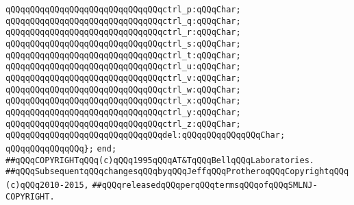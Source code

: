 \verb|qQQqqQQqqQQqqQQqqQQqqQQqqQQqqQQqctrl_p:qQQqChar;|\newline
\verb|qQQqqQQqqQQqqQQqqQQqqQQqqQQqqQQqctrl_q:qQQqChar;|\newline
\verb|qQQqqQQqqQQqqQQqqQQqqQQqqQQqqQQqctrl_r:qQQqChar;|\newline
\verb|qQQqqQQqqQQqqQQqqQQqqQQqqQQqqQQqctrl_s:qQQqChar;|\newline
\verb|qQQqqQQqqQQqqQQqqQQqqQQqqQQqqQQqctrl_t:qQQqChar;|\newline
\verb|qQQqqQQqqQQqqQQqqQQqqQQqqQQqqQQqctrl_u:qQQqChar;|\newline
\verb|qQQqqQQqqQQqqQQqqQQqqQQqqQQqqQQqctrl_v:qQQqChar;|\newline
\verb|qQQqqQQqqQQqqQQqqQQqqQQqqQQqqQQqctrl_w:qQQqChar;|\newline
\verb|qQQqqQQqqQQqqQQqqQQqqQQqqQQqqQQqctrl_x:qQQqChar;|\newline
\verb|qQQqqQQqqQQqqQQqqQQqqQQqqQQqqQQqctrl_y:qQQqChar;|\newline
\verb|qQQqqQQqqQQqqQQqqQQqqQQqqQQqqQQqctrl_z:qQQqChar;|\newline
\verb|qQQqqQQqqQQqqQQqqQQqqQQqqQQqqQQqdel:qQQqqQQqqQQqqQQqChar;|\newline
\verb|qQQqqQQqqQQqqQQq};|\newline
\verb|end;|\newline
\newline
\newline
\verb|##qQQqCOPYRIGHTqQQq(c)qQQq1995qQQqAT&TqQQqBellqQQqLaboratories.|\newline
\verb|##qQQqSubsequentqQQqchangesqQQqbyqQQqJeffqQQqProtheroqQQqCopyrightqQQq(c)qQQq2010-2015,|\newline
\verb|##qQQqreleasedqQQqperqQQqtermsqQQqofqQQqSMLNJ-COPYRIGHT.|\newline

